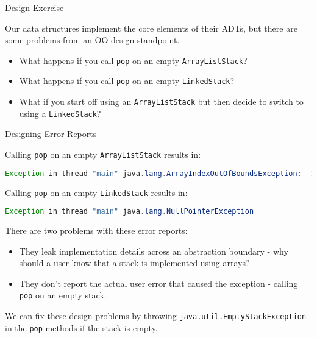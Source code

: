 \documentclass{beamer}
\begin{document}
\begin{frame}[fragile]{Design Exercise}


Our data structures implement the core elements of their ADTs, but there are some problems from an OO design standpoint.
\begin{itemize}
\item What happens if you call {\tt pop} on an empty {\tt ArrayListStack}?
\item What happens if you call {\tt pop} on an empty {\tt LinkedStack}?
\item What if you start off using an {\tt ArrayListStack} but then decide to switch to using a {\tt LinkedStack}?
\end{itemize}


\end{frame}

\begin{frame}[fragile]{Designing Error Reports}


Calling {\tt pop} on an empty {\tt ArrayListStack} results in:
\begin{lstlisting}[language=Java]
Exception in thread "main" java.lang.ArrayIndexOutOfBoundsException: -1
\end{lstlisting}

Calling {\tt pop} on an empty {\tt LinkedStack} results in:
\begin{lstlisting}[language=Java]
Exception in thread "main" java.lang.NullPointerException
\end{lstlisting}
There are two problems with these error reports:
\begin{itemize}
\item They leak implementation details across an abstraction boundary - why should a user know that a stack is implemented using arrays?
\item They don't report the actual user error that caused the exception - calling {\tt pop} on an empty stack.
\end{itemize}

We can fix these design problems by throwing {\tt java.util.EmptyStackException} in the {\tt pop} methods if the stack is empty.

\end{frame}
\end{document}
